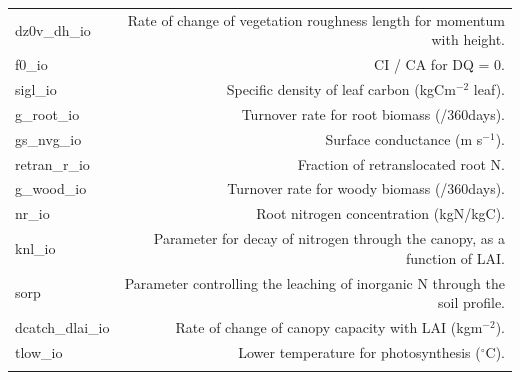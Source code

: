 \documentclass[gmd, manuscript]{copernicus}
\begin{document}
\begin{table}[ht]
\begin{tabular}{l r}
  dz0v\_dh\_io & Rate of change of vegetation roughness length for momentum with height. \\ 
  f0\_io & CI / CA for DQ = 0. \\ 
  sigl\_io & Specific density of leaf carbon (kgCm$^{-2}$ leaf).\\ 
  g\_root\_io & Turnover rate for root biomass (/360days). \\ 
  gs\_nvg\_io & Surface conductance (m s$^{-1}$). \\ 
  retran\_r\_io & Fraction of retranslocated root N.\\ 
  g\_wood\_io &  Turnover rate for woody biomass (/360days).\\ 
  nr\_io &  Root nitrogen concentration (kgN/kgC).\\ 
  knl\_io & Parameter for decay of nitrogen through the canopy, as a function of LAI.\\ 
  sorp & Parameter controlling the leaching of inorganic N through the soil profile. \\ 
  dcatch\_dlai\_io &Rate of change of canopy capacity with LAI (kgm$^{-2}$).  \\ 
  tlow\_io & Lower temperature for photosynthesis ($^\circ$C).\\  
\bottomhline
\end{tabular}
\belowtable{} %

\end{table}
\end{document}
